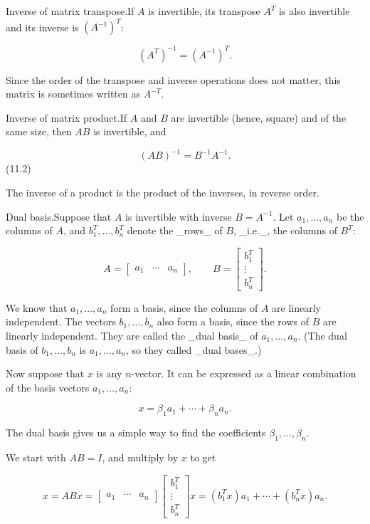 Inverse of matrix transpose.If \(A\) is invertible, its transpose \(A^{T}\) is also invertible and its inverse is \((A^{-1})^{T}\):

\[(A^{T})^{-1}=(A^{-1})^{T}.\]

Since the order of the transpose and inverse operations does not matter, this matrix is sometimes written as \(A^{-T}\).

Inverse of matrix product.If \(A\) and \(B\) are invertible (hence, square) and of the same size, then \(AB\) is invertible, and

\[(AB)^{-1}=B^{-1}A^{-1}.\] (11.2)

The inverse of a product is the product of the inverses, in reverse order.

Dual basis.Suppose that \(A\) is invertible with inverse \(B=A^{-1}\). Let \(a_{1},\ldots,a_{n}\) be the columns of \(A\), and \(b_{1}^{T},\ldots,b_{n}^{T}\) denote the _rows_ of \(B\), _i.e._, the columns of \(B^{T}\):

\[A=\left[\begin{array}{ccc}a_{1}&\cdots&a_{n}\end{array}\right],\qquad B= \left[\begin{array}{c}b_{1}^{T}\\ \vdots\\ b_{n}^{T}\end{array}\right].\]

We know that \(a_{1},\ldots,a_{n}\) form a basis, since the columns of \(A\) are linearly independent. The vectors \(b_{1},\ldots,b_{n}\) also form a basis, since the rows of \(B\) are linearly independent. They are called the _dual basis_ of \(a_{1},\ldots,a_{n}\). (The dual basis of \(b_{1},\ldots,b_{n}\) is \(a_{1},\ldots,a_{n}\), so they called _dual bases_.)

Now suppose that \(x\) is any \(n\)-vector. It can be expressed as a linear combination of the basis vectors \(a_{1},\ldots,a_{n}\):

\[x=\beta_{1}a_{1}+\cdots+\beta_{n}a_{n}.\]

The dual basis gives us a simple way to find the coefficients \(\beta_{1},\ldots,\beta_{n}\).

We start with \(AB=I\), and multiply by \(x\) to get

\[x=ABx=\left[\begin{array}{ccc}a_{1}&\cdots&a_{n}\end{array}\right]\left[ \begin{array}{c}b_{1}^{T}\\ \vdots\\ b_{n}^{T}\end{array}\right]x=(b_{1}^{T}x)a_{1}+\cdots+(b_{n}^{T}x)a_{n}.\]

